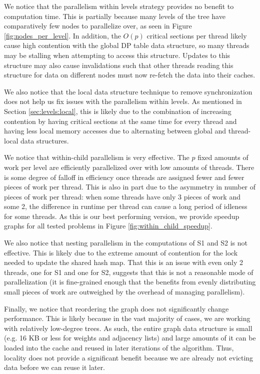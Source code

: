 \documentclass[11pt]{article}
\begin{document}
We notice that the parallelism within levels strategy provides no benefit to computation time. 
This is partially because many levels of the tree have comparatively few nodes to parallelize over, as seen in Figure \ref{fig:nodes_per_level}.
In addition, the $O(p)$ critical sections per thread likely cause high contention with the global DP table data structure, so many threads may be stalling when attempting to access this structure.
Updates to this structure may also cause invalidations such that other threads reading this structure for data on different nodes must now re-fetch the data into their caches.

We also notice that the local data structure technique to remove synchronization does not help us fix issues with the parallelism within levels.
As mentioned in Section \ref{sec:levels:local}, this is likely due to the combination of increasing contention by having critical sections at the same time for every thread and having less local memory accesses due to alternating between global and thread-local data structures.

We notice that within-child parallelism is very effective.
The $p$ fixed amounts of work per level are efficiently parallelized over with low amounts of threads.
There is some degree of falloff in efficiency once threads are assigned fewer and fewer pieces of work per thread.
This is also in part due to the asymmetry in number of pieces of work per thread: when some threads have only 3 pieces of work and some 2, the difference in runtime per thread can cause a long period of idleness for some threads.
As this is our best performing version, we provide speedup graphs for all tested problems in Figure \ref{fig:within_child_speedup}.

We also notice that nesting parallelism in the computations of S1 and S2 is not effective.
This is likely due to the extreme amount of contention for the lock needed to update the shared hash map.
That this is an issue with even only 2 threads, one for S1 and one for S2, suggests that this is not a reasonable mode of parallelization (it is fine-grained enough that the benefits from evenly distributing small pieces of work are outweighed by the overhead of managing parallelism).

Finally, we notice that reordering the graph does not significantly change performance.
This is likely because in the vast majority of cases, we are working with relatively low-degree trees.
As such, the entire graph data structure is small (e.g. 16 KB or less for weights and adjacency lists) and large amounts of it can be loaded into the cache and reused in later iterations of the algorithm.
Thus, locality does not provide a significant benefit because we are already not evicting data before we can reuse it later.
\end{document}
